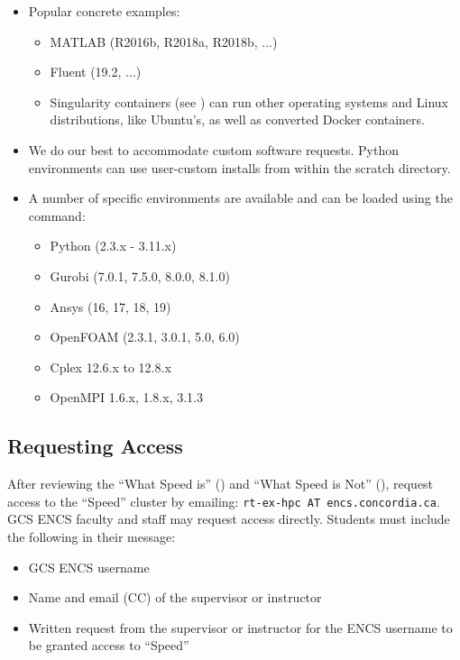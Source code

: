 \documentclass{easychair}
\begin{document}
\begin{itemize}
	\item 
Popular concrete examples:
\begin{itemize}
	\item 
MATLAB (R2016b, R2018a, R2018b, ...)
	\item 
Fluent (19.2, ...)
	\item 
Singularity containers (see ) can run other 
operating systems and Linux distributions, like Ubuntu's, as well as 
converted Docker containers.
\end{itemize}
	\item 
We do our best to accommodate custom software requests.
Python environments can use user-custom installs 
from within the scratch directory.
	\item 
A number of specific environments are available and 
can be loaded using the  command:
\begin{itemize}
	\item 
Python (2.3.x - 3.11.x)
	\item 
Gurobi (7.0.1, 7.5.0, 8.0.0, 8.1.0)
	\item 
Ansys (16, 17, 18, 19)
	\item 
OpenFOAM (2.3.1, 3.0.1, 5.0, 6.0)
	\item 
Cplex 12.6.x to 12.8.x
	\item 
OpenMPI 1.6.x, 1.8.x, 3.1.3
\end{itemize}
\end{itemize}

\subsection{Requesting Access}
\label{sect:access}

After reviewing the ``What Speed is'' () and
``What Speed is Not'' (), request access to the ``Speed'' 
cluster by emailing: \texttt{rt-ex-hpc AT encs.concordia.ca}.
%
GCS ENCS faculty and staff may request access directly.
Students must include the following in their message:

\begin{itemize} 
	\item GCS ENCS username
	\item Name and email (CC) of the supervisor or instructor
	\item Written request from the supervisor or instructor for the ENCS username to be granted access to ``Speed''
\end{itemize}
\end{document}
